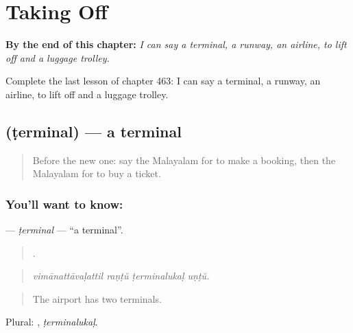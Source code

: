 
\chapter{Taking Off}
\label{ch:ml-taking-off}

\begin{chapteropening}
\textbf{By the end of this chapter:} \emph{I can say a terminal, a runway, an airline, to lift off and a luggage trolley.}

Complete the last lesson of chapter 463: I can say a terminal, a runway, an airline, to lift off and a luggage trolley.
\end{chapteropening}

\section[\texorpdfstring{\ml{ടെർമിനൽ} (ṭerminal)}{ടെർമിനൽ (ṭerminal)}]{ (ṭerminal) — a terminal}

\label{lesson:ML-C463-terminal}



\begin{quote}
Before the new one: say the Malayalam for to make a booking, then the Malayalam for to buy a ticket.
\end{quote}

\subsection*{You'll want to know: }
\textbf{} — \emph{ṭerminal} — \textquotedblleft{}a terminal\textquotedblright{}.

\begin{quote}
   .
\end{quote}

\begin{quote}
\emph{vimānattāvaḷattil raṇṭŭ ṭerminalukaḷ uṇṭŭ.}
\end{quote}

\begin{quote}
The airport has two terminals.
\end{quote}

Plural: , \emph{ṭerminalukaḷ}.

